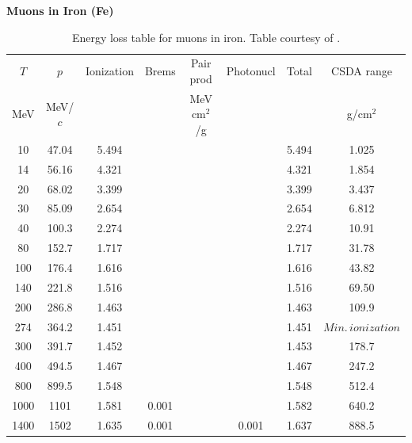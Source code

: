 \begin{table}
\caption*{\textbf{Muons in Iron (Fe)}}
\begin{tabularx}{\textwidth}{cccccccc}
\hline \hline
$T$ & $p$ & Ionization & Brems & Pair prod & Photonucl & Total & CSDA range\vspace{-12pt}\\
MeV & MeV/$c$ & \multicolumn{2}{c}{\sout{\hspace{3cm}}} & MeV cm$^2$/g & \multicolumn{2}{c}{\sout{\hspace{3cm}}} & g/cm$^2$\\ \hline
10 & 47.04 & 5.494 & &&& 5.494 & 1.025\vspace{-12pt}\\
14 & 56.16 & 4.321 & & & & 4.321 & 1.854\vspace{-12pt}\\
20 & 68.02 & 3.399 &  &   &  			& 3.399 & 3.437 \vspace{-12pt}\\
30 & 85.09 & 2.654 &  &  &  			& 2.654 & 6.812 \vspace{-12pt}\\
40 & 100.3 & 2.274 &  &  &  			& 2.274 & 10.91 \vspace{-12pt}\\
80 & 152.7 & 1.717 &  &  &  			& 1.717 & 31.78 \vspace{-12pt}\\
100 & 176.4 & 1.616 & &   &  			& 1.616 & 43.82 \vspace{-12pt}\\
140 & 221.8 & 1.516 & &   &  			& 1.516 & 69.50 \vspace{-12pt}\\
200 & 286.8 & 1.463 & &   &  			& 1.463 & 109.9 \vspace{-12pt}\\
274 & 364.2 & 1.451 & &   &  			& 1.451 & $Min.\, ionization$ \vspace{-12pt}\\
300 & 391.7 & 1.452 & &   &  			& 1.453 & 178.7 \vspace{-12pt}\\
400 & 494.5 & 1.467 & &   &  			& 1.467 & 247.2 \vspace{-12pt}\\
800 & 899.5 & 1.548 & &   &  			& 1.548 & 512.4 \vspace{-12pt}\\
1000 & 1101 & 1.581  & 0.001 & &  		& 1.582 & 640.2 \vspace{-12pt}\\
1400 & 1502 & 1.635  & 0.001 & & 0.001 	& 1.637 & 888.5\\
\hline
\end{tabularx}
\caption{Energy loss table for muons in iron. Table courtesy of \cite{PDGTables}.}
\label{tbl:elossfe}
\end{table}

